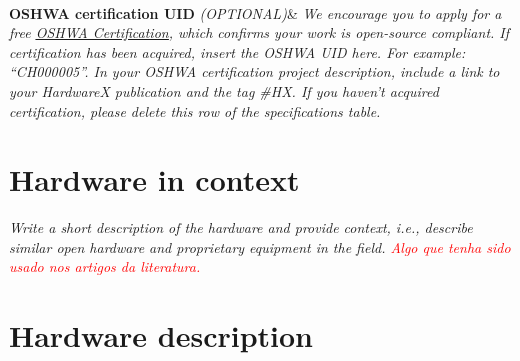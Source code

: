 \documentclass[11pt, letterpaper]{article}
\begin{document}
\begin{flushleft}
\begin{tabu}
  \\
\hline \textbf{OSHWA certification UID} \vskip 0.1cm {\it (OPTIONAL)}&
{\it We encourage you to apply for a free \href{https://certification.oshwa.org/}{\underline{OSHWA Certification}}, which confirms your work is open-source compliant.
\vskip 0.2cm
If certification has been acquired, insert the OSHWA UID here. For example: “CH000005”. In your OSHWA certification project description, include a link to your HardwareX publication and the tag \#HX.
\vskip 0.2cm
If you haven’t acquired certification, please delete this row of the specifications table.}
\\\hline
\end{tabu}
\end{flushleft}
\newpage
\section{Hardware in context}
\textit{Write a short description of the hardware and provide context, i.e., describe similar open hardware and proprietary equipment in the field. \textcolor{red}{Algo que tenha sido usado nos artigos da literatura.}}
\section{Hardware description}

\end{document}
